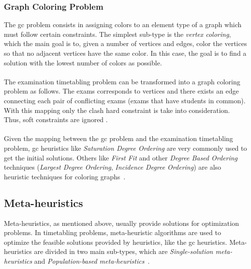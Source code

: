 \subsubsection{Graph Coloring Problem}
The \gls{gc} problem consists in assigning colors to an element type of a graph which must follow certain constraints. The simplest sub-type is the \textit{vertex coloring}, which the main goal is to, given a number of vertices and edges, color the vertices so that no adjacent vertices have the same color. In this case, the goal is to find a solution with the lowest number of colors as possible.\\
\\
The examination timetabling problem can be transformed into a graph coloring problem as follows. The exams corresponds to vertices and there exists an edge connecting each pair of conflicting exams (exams that have students in common). With this mapping only the clash hard constraint is take into consideration. Thus, soft constraints are ignored \cite{Qu2009}.\\
\\
Given the mapping between the \gls{gc} problem and the examination timetabling problem, \gls{gc} heuristics like \textit{Saturation Degree Ordering} are very commonly used to get the initial solutions. Others like \textit{First Fit} and other \textit{Degree Based Ordering} techniques (\textit{Largest Degree Ordering}, \textit{Incidence Degree Ordering}) are also heuristic techniques for coloring graphs~\cite{Carter1996}.


\subsection{Meta-heuristics}
\label{metaheuristics}
Meta-heuristics, as mentioned above, usually provide solutions for optimization problems. In timetabling problems, meta-heuristic algorithms are used to optimize the feasible solutions provided by heuristics, like the \gls{gc} heuristics. Meta-heuristics are divided in two main sub-types, which are \textit{Single-solution meta-heuristics} and \textit{Population-based meta-heuristics}~\cite{Talbi2009}.

